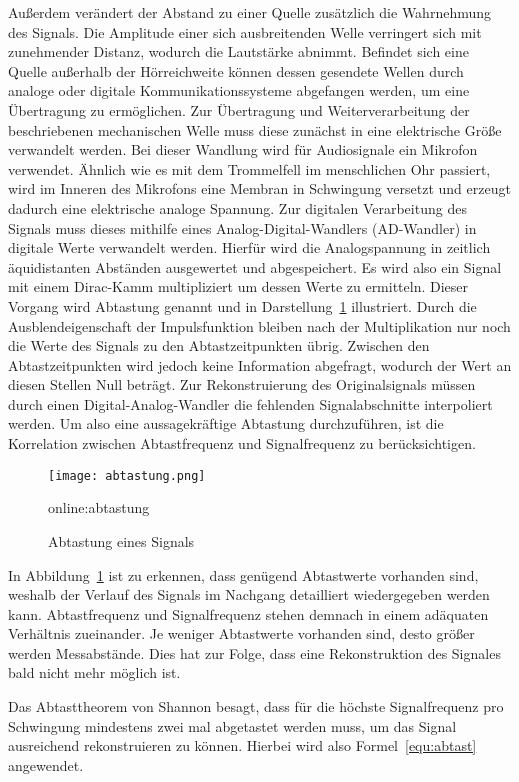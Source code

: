 Außerdem verändert der Abstand zu einer Quelle zusätzlich die Wahrnehmung des Signals. Die Amplitude einer sich ausbreitenden Welle verringert sich mit zunehmender Distanz, wodurch die Lautstärke abnimmt. Befindet sich eine Quelle außerhalb der Hörreichweite können dessen gesendete Wellen durch analoge oder digitale Kommunikationssysteme abgefangen werden, um eine Übertragung zu ermöglichen. Zur Übertragung und Weiterverarbeitung der beschriebenen mechanischen Welle muss diese zunächst in eine elektrische Größe verwandelt werden. Bei dieser Wandlung wird für Audiosignale ein Mikrofon verwendet. Ähnlich wie es mit dem Trommelfell im menschlichen Ohr passiert, wird im Inneren des Mikrofons eine Membran in Schwingung versetzt und erzeugt dadurch eine elektrische analoge Spannung.
Zur digitalen Verarbeitung des Signals muss dieses mithilfe eines Analog-Digital-Wandlers
(AD-Wandler) in digitale Werte verwandelt werden. Hierfür wird die Analogspannung in zeitlich äquidistanten Abständen ausgewertet und abgespeichert. Es wird also ein Signal mit einem Dirac-Kamm multipliziert um dessen Werte zu ermitteln. Dieser Vorgang wird Abtastung genannt und in Darstellung~\ref{fig:abtastung} illustriert. Durch die Ausblendeigenschaft der Impulsfunktion bleiben nach der Multiplikation nur noch die Werte des Signals zu den Abtastzeitpunkten übrig. Zwischen den Abtastzeitpunkten wird jedoch keine Information abgefragt, wodurch der Wert an diesen Stellen Null beträgt. Zur Rekonstruierung des Originalsignals müssen durch einen Digital-Analog-Wandler die fehlenden Signalabschnitte interpoliert werden. Um also eine aussagekräftige Abtastung durchzuführen, ist die Korrelation zwischen Abtastfrequenz und Signalfrequenz zu berücksichtigen.


\begin{figure}[H]
	\centering
	\texttt{[image: abtastung.png]}
	\caption[Abtastung eines Signals]{Abtastung eines Signals} \gls{online:abtastung}
	\label{fig:abtastung}
\end{figure}

In Abbildung~\ref{fig:abtastung} ist zu erkennen, dass genügend Abtastwerte vorhanden sind, weshalb der Verlauf des Signals im Nachgang detailliert wiedergegeben werden kann. Abtastfrequenz und Signalfrequenz stehen demnach in einem adäquaten Verhältnis zueinander. Je weniger Abtastwerte vorhanden sind, desto größer werden Messabstände. Dies hat zur Folge, dass eine Rekonstruktion des Signales bald nicht mehr möglich ist.\cite{masteraudio}

Das Abtasttheorem von Shannon besagt, dass für die höchste Signalfrequenz pro Schwingung mindestens zwei mal abgetastet werden muss, um das Signal ausreichend rekonstruieren zu können. Hierbei wird also Formel~\ref{equ:abtast} angewendet.

